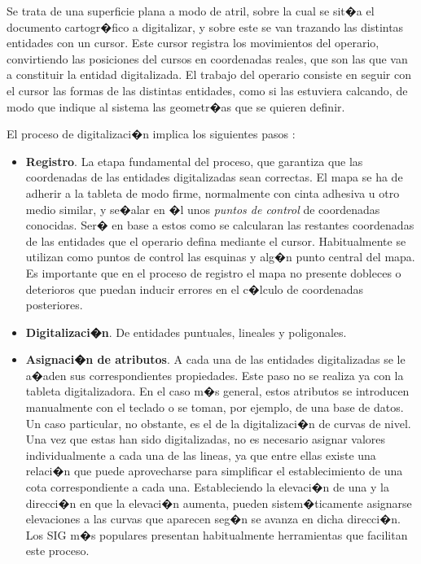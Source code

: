 Se trata de una superficie plana a modo de atril, sobre la cual se sit�a el documento cartogr�fico a digitalizar, y sobre este se van trazando las distintas entidades con un cursor. Este cursor registra los movimientos del operario, convirtiendo las posiciones del cursos en coordenadas reales, que son las que van a constituir la entidad digitalizada. El trabajo del operario consiste en seguir con el cursor las formas de las distintas entidades, como si las estuviera calcando, de modo que indique al sistema las geometr�as que se quieren definir.

El proceso de digitalizaci�n implica los siguientes pasos \cite{Heywood1998Longman}:

\begin{itemize}
	\item \textbf{Registro}. La etapa fundamental del proceso, que garantiza que las coordenadas de las entidades digitalizadas sean correctas. El mapa se ha de adherir a la tableta de modo firme, normalmente con cinta adhesiva u otro medio similar, y se�alar en �l unos \emph{puntos de control} de coordenadas conocidas. Ser� en base a estos como se calcularan las restantes coordenadas de las entidades que el operario defina mediante el cursor. Habitualmente se utilizan como puntos de control las esquinas y alg�n punto central del mapa. Es importante que en el proceso de registro el mapa no presente dobleces o deterioros que puedan inducir errores en el c�lculo de coordenadas posteriores.
	\item \textbf{Digitalizaci�n}. De entidades puntuales, lineales y poligonales.
	\item \textbf{Asignaci�n de atributos}. A cada una de las entidades digitalizadas se le a�aden sus correspondientes propiedades. Este paso no se realiza ya con la tableta digitalizadora.
	En el caso m�s general, estos atributos se introducen manualmente con el teclado o se toman, por ejemplo, de una base de datos. Un caso particular, no obstante, es el de la digitalizaci�n de curvas de nivel. Una vez que estas han sido digitalizadas, no es necesario asignar valores individualmente a cada una de las lineas, ya que entre ellas existe una relaci�n que puede aprovecharse para simplificar el establecimiento de una cota correspondiente a cada una. Estableciendo la elevaci�n de una y la direcci�n en que la elevaci�n aumenta, pueden sistem�ticamente asignarse elevaciones a las curvas que aparecen seg�n se avanza en dicha direcci�n. Los SIG m�s populares presentan habitualmente herramientas que facilitan este proceso.
\end{itemize}

